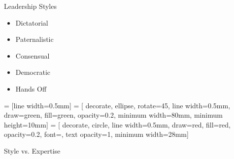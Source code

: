 

\begin{frame}{Leadership Styles}
  \begin{itemize}
    \item Dictatorial
    \item Paternalistic
    \item Consensual
    \item Democratic
    \item Hands Off
  \end{itemize}
\end{frame}

 = [line width=0.5mm]
 = [
    decorate, ellipse, rotate=45, line width=0.5mm, draw=green,
    fill=green, opacity=0.2,
    minimum width=80mm, minimum height=10mm]
 = [
    decorate, circle, line width=0.5mm, draw=red,
    fill=red, opacity=0.2, font=\small, text opacity=1,
    minimum width=28mm]

\begin{frame}[label=style_plot]{Style vs. Expertise}
    \begin{center}
        \HumorSans
    \end{center}

\end{frame}
